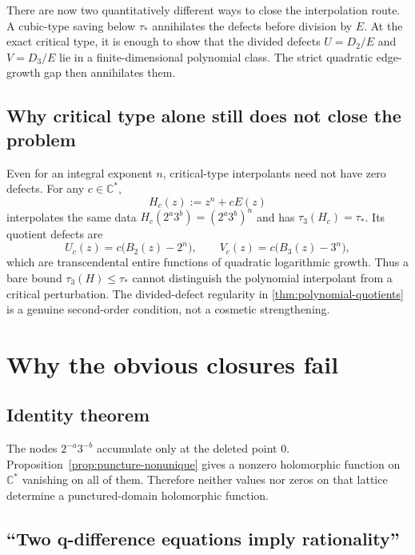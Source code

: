 \documentclass[11pt,oneside]{article}
\theoremstyle{definition}
\theoremstyle{remark}
\newcommand{\C}{\mathbb C}
\begin{document}
\begin{resultbox}
There are now two quantitatively different ways to close the interpolation route.  A cubic-type saving below \(\tau_*\) annihilates the defects before division by \(E\).  At the exact critical type, it is enough to show that the divided defects \(U=D_2/E\) and \(V=D_3/E\) lie in a finite-dimensional polynomial class.  The strict quadratic edge-growth gap then annihilates them.
\end{resultbox}

\subsection{Why critical type alone still does not close the problem}

Even for an integral exponent \(n\), critical-type interpolants need not have zero defects.  For any \(c\in\C^*\),
\begin{equation}
  H_c(z):=z^n+cE(z)
  \label{eq:critical-family}
\end{equation}
interpolates the same data \(H_c(2^a3^b)=(2^a3^b)^n\) and has \(\tau_3(H_c)=\tau_*\).  Its quotient defects are
\begin{equation}
  U_c(z)=c\bigl(B_2(z)-2^n\bigr),
  \qquad
  V_c(z)=c\bigl(B_3(z)-3^n\bigr),
  \label{eq:critical-family-quotients}
\end{equation}
which are transcendental entire functions of quadratic logarithmic growth.  Thus a bare bound \(\tau_3(H)\le\tau_*\) cannot distinguish the polynomial interpolant from a critical perturbation.  The divided-defect regularity in \cref{thm:polynomial-quotients} is a genuine second-order condition, not a cosmetic strengthening.


\section{Why the obvious closures fail}

\subsection{Identity theorem}

The nodes \(2^{-a}3^{-b}\) accumulate only at the deleted point \(0\).  Proposition~\ref{prop:puncture-nonunique} gives a nonzero holomorphic function on \(\C^*\) vanishing on all of them.  Therefore neither values nor zeros on that lattice determine a punctured-domain holomorphic function.

\subsection{``Two q-difference equations imply rationality''}
\end{document}
